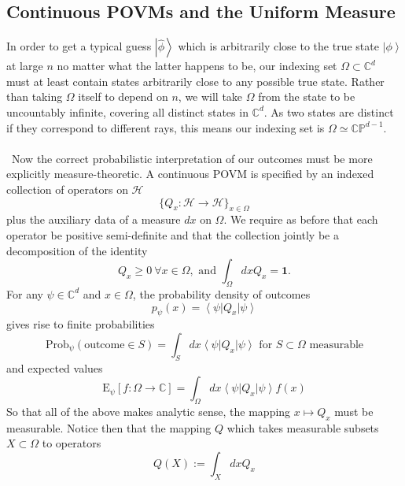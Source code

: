 \documentclass[11pt,letterpaper]{article}
\newcommand{\mc}[1]{\mathcal{#1}}
\newcommand{\C}{\mathbb{C}}
\newcommand{\KET}[1]{\left| #1 \right\rangle }
\newcommand{\BRA}[1]{\left\langle #1 \right| }
\begin{document}
\subsection{Continuous POVMs and the Uniform Measure}
In order to get a typical guess $\KET{\hat{\phi}}$ which is arbitrarily close to the true state $\KET{\phi}$ at large $n$ no matter what the latter happens to be, our indexing set $\Omega \subset \C^d$ must at least contain states arbitrarily close to any possible true state. Rather than taking $\Omega$ itself to depend on $n$, we will take $\Omega$ from the state to be uncountably infinite, covering all distinct states in $\C^d$. As two states are distinct if they correspond to different rays, this means our indexing set is $\Omega \simeq \C \mathbb{P}^{d-1}$.\\
\\
\
Now the correct probabilistic interpretation of our outcomes must be more explicitly measure-theoretic. A continuous POVM is specified by an indexed collection of operators on $\mc{H}$ \begin{equation}
\{ Q_x : \mc{H} \to \mc{H} \}_{x \in \Omega}
\end{equation}
plus the auxiliary data of a measure $dx$ on $\Omega$.  We require as before that each operator be positive semi-definite and that the collection jointly be a decomposition of the identity \begin{equation}
Q_x \geq 0 \ \forall x \in \Omega, \mbox{ and } \int_\Omega dx Q_x = \mathbf{1}.
\end{equation}
For any $\psi \in \C^d$ and $x \in \Omega$, the probability density of outcomes \begin{equation}
p_\psi(x) = \BRA{\psi} Q_x \KET{\psi}
\end{equation}
gives rise to finite probabilities \begin{equation}
\mbox{Prob}_\psi (\mbox{outcome} \in S) = \int_S dx \BRA{\psi} Q_x \KET{\psi} \mbox{ for } S \subset \Omega \mbox{ measurable}
\end{equation}
and expected values \begin{equation}
\mbox{E}_\psi [f: \Omega \to \C] = \int_\Omega dx \BRA{\psi} Q_x \KET{\psi} f(x)
\end{equation}
So that all of the above makes analytic sense, the mapping $x \mapsto Q_x$ must be measurable.  Notice then that the mapping $Q$ which takes measurable subsets $X \subset \Omega$ to operators \begin{equation}
Q(X) := \int_X dx Q_x
\end{equation}
\end{document}
